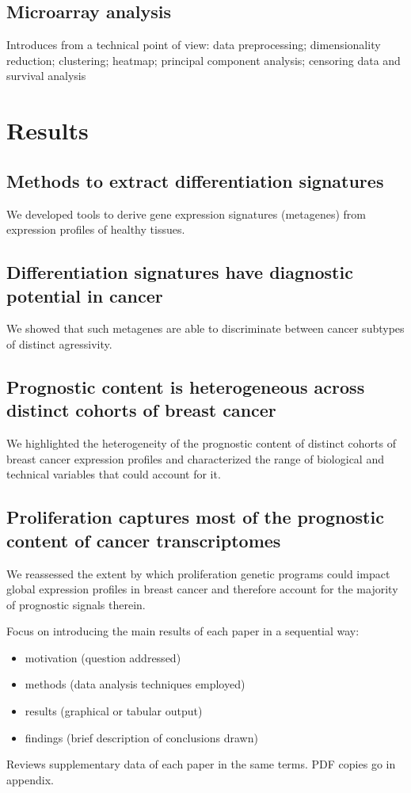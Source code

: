 \documentclass[11pt]{article}
\begin{document}
\subsection{Microarray analysis}
\label{sec-3-3}
Introduces from a technical point of view: data preprocessing; dimensionality
reduction; clustering; heatmap; principal component analysis; censoring data and
survival analysis

\section{Results}
\label{sec-4}
\subsection{Methods to extract differentiation signatures}
\label{sec-4-1}
We developed tools to derive gene expression signatures (metagenes) from
expression profiles of healthy tissues.

\subsection{Differentiation signatures have diagnostic potential in cancer}
\label{sec-4-2}
We showed that such metagenes are able to discriminate between cancer subtypes
of distinct agressivity.

\subsection{Prognostic content is heterogeneous across distinct cohorts of breast cancer}
\label{sec-4-3}
We highlighted the heterogeneity of the prognostic content of distinct cohorts
of breast cancer expression profiles and characterized the range of biological
and technical variables that could account for it.

\subsection{Proliferation captures most of the prognostic content of cancer transcriptomes}
\label{sec-4-4}
We reassessed the extent by which proliferation genetic programs could impact
global expression profiles in breast cancer and therefore account for the
majority of prognostic signals therein.

Focus on introducing the main results of each paper in a sequential way:
\begin{itemize}
\item motivation (question addressed)
\item methods (data analysis techniques employed)
\item results (graphical or tabular output)
\item findings (brief description of conclusions drawn)
\end{itemize}
Reviews supplementary data of each paper in the same terms. PDF copies go in
appendix.
\end{document}
